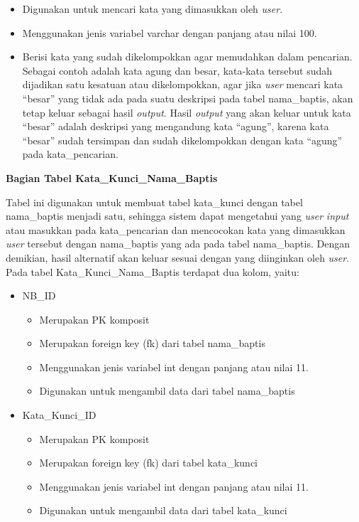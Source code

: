 \documentclass[a4paper,twoside]{article}
\begin{document}
\begin{enumerate}
\begin{itemize}
		\begin{itemize}
			\item Digunakan untuk mencari kata yang dimasukkan oleh \textit{user}.
			\item Menggunakan jenis variabel varchar dengan panjang atau nilai 100.
			\item Berisi kata yang sudah dikelompokkan agar memudahkan dalam pencarian. Sebagai contoh adalah kata agung dan besar, kata-kata tersebut sudah dijadikan satu kesatuan atau dikelompokkan, agar jika \textit{user} mencari kata ``besar'' yang tidak ada pada suatu deskripsi pada tabel nama\_baptis, akan tetap keluar sebagai hasil \textit{output}. Hasil \textit{output} yang akan keluar untuk kata ``besar'' adalah deskripsi yang mengandung kata ``agung'', karena kata ``besar'' sudah tersimpan dan sudah dikelompokkan dengan kata ``agung'' pada kata\_pencarian.
			
		\end{itemize}
	\end{itemize}
	
\textbf{Bagian Tabel Kata\_Kunci\_Nama\_Baptis}

Tabel ini digunakan untuk membuat tabel kata\_kunci dengan tabel nama\_baptis menjadi satu, sehingga sistem dapat mengetahui yang \textit{user} \textit{input} atau masukkan pada kata\_pencarian dan mencocokan kata yang dimasukkan \textit{user} tersebut dengan nama\_baptis yang ada pada tabel nama\_baptis. Dengan demikian, hasil alternatif akan keluar sesuai dengan yang diinginkan oleh \textit{user}. Pada tabel Kata\_Kunci\_Nama\_Baptis terdapat dua kolom, yaitu:

	\begin{itemize}
		\item NB\_ID 
		
		\begin{itemize}
		\item Merupakan PK komposit
		\item Merupakan foreign key (fk) dari tabel nama\_baptis
		\item Menggunakan jenis variabel int dengan panjang atau nilai 11.
		\item Digunakan untuk mengambil data dari tabel nama\_baptis
		\end{itemize}
		
		\item Kata\_Kunci\_ID 
		
		\begin{itemize}
		\item Merupakan PK komposit
		\item Merupakan foreign key (fk) dari tabel kata\_kunci
		\item Menggunakan jenis variabel int dengan panjang atau nilai 11.
		\item Digunakan untuk mengambil data dari tabel kata\_kunci
		\end{itemize}
\end{itemize}


\end{enumerate}
\end{document}
